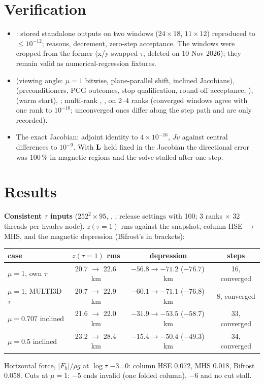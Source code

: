 \adjointpoissontrue


\section{Verification}
\begin{itemize}
\item {}: stored standalone outputs on two windows ($24\times18$, $11\times12$) reproduced to $\le10^{-12}$;
reasons, decrement, zero-step acceptance. The windows were cropped from the former  (x/y-swapped
$\tau$, deleted on 10 Nov 2026); they remain valid as numerical-regression fixtures.
\item {} (viewing angle: $\mu=1$ bitwise, plane-parallel shift, inclined Jacobians), 
(preconditioners, PCG outcomes, stop qualification, round-off acceptance, ),  (warm start),
; multi-rank , ,  on 2--4 ranks
(converged windows agree with one rank to $10^{-10}$; unconverged ones differ along the step path and are only recorded).
\item The exact Jacobian: adjoint identity to $4\times10^{-16}$, $Jv$ against central differences to $10^{-9}$. With $\mathbf L$ held fixed
in the Jacobian the directional error was 100\,\% in magnetic regions and the solve stalled after one step.
\end{itemize}

\section{Results}
\textbf{Consistent $\tau$ inputs} ($252^2\times95$, , ; release settings
with  100; 3 ranks $\times$ 32 threads per hyades node). $z(\tau{=}1)$ rms against the snapshot, column HSE
$\to$ MHS, and the magnetic depression (Bifrost's in brackets):
\begin{center}\small
\begin{tabular}{lccc}
\toprule
case & $z(\tau{=}1)$ rms & depression & steps \\ \midrule
$\mu=1$, own $\tau$ & 20.7 $\to$ 22.6\,km & $-56.8\to-71.2$ ($-76.7$)\,km & 16, converged \\
$\mu=1$, MULTI3D $\tau$ & 20.7 $\to$ 22.9\,km & $-60.1\to-71.1$ ($-76.8$)\,km & 8, converged \\
$\mu=0.707$ inclined & 21.6 $\to$ 22.0\,km & $-31.9\to-53.5$ ($-58.7$)\,km & 33, converged \\
$\mu=0.5$ inclined & 23.2 $\to$ 28.4\,km & $-15.4\to-50.4$ ($-49.3$)\,km & 34, converged \\
\bottomrule
\end{tabular}
\end{center}
Horizontal force, $|F_h|/\rho g$ at $\log\tau$ $-3\ldots0$: column HSE 0.072, MHS 0.018, Bifrost 0.058. Cuts at $\mu=1$: $-5$ ends
invalid (one folded column), $-6$ and no cut stall.

